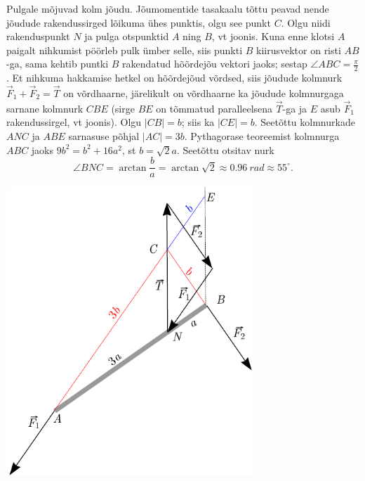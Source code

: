 \solu
Pulgale mõjuvad kolm jõudu. Jõumomentide tasakaalu tõttu peavad nende jõudude rakendussirged lõikuma ühes punktis, olgu see punkt $C$. Olgu niidi rakenduspunkt $N$ ja pulga otspunktid $A$ ning $B$, vt joonis. Kuna enne klotsi $A$ paigalt nihkumist pöörleb pulk ümber selle, siis punkti $B$ kiirusvektor on risti $AB$-ga, sama kehtib puntki $B$ rakendatud hõõrdejõu vektori jaoks; sestap $\angle ABC=\frac{\pi}{2}$. Et nihkuma hakkamise hetkel on hõõrdejõud võrdsed, siis jõudude kolmnurk $\vec F_1+\vec F_2=\vec T$ on võrdhaarne, järelikult on võrdhaarne ka jõudude kolmnurgaga sarnane kolmnurk $CBE$ (sirge $BE$ on tõmmatud paralleelsena $\vec T$-ga ja $E$ asub $\vec F_1$ rakendussirgel, vt joonis).
Olgu $|CB|=b$; siis ka $|CE|=b$. Seetõttu kolmnurkade $ANC$ ja $ABE$ sarnasuse põhjal $|AC|=3b$. Pythagorase
teoreemist kolmnurga $ABC$ jaoks $9b^2=b^2+16a^2$, st $b=\sqrt 2a$. Seetõttu otsitav nurk 
\[
\angle BNC=\arctan \frac ba =\arctan \sqrt 2\approx\SI{0.96}{rad}\approx 55^\circ.
\]
\begin{center}
\includegraphics[width=0.7\textwidth]{2015-v3g-09-pulk_lah}
\end{center}

